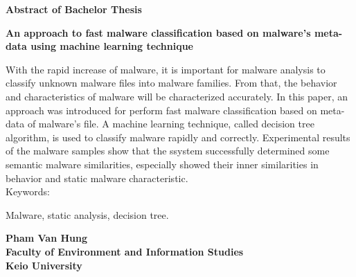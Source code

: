 \begin{center}


\begin{Large}
{\bf Abstract of Bachelor Thesis} \\

\vspace{5mm}

{\bf An approach to fast malware classification based on malware's meta-data using machine learning technique}
\end{Large}
\end{center}

\vspace{0.8cm}
 
  With the rapid increase of malware, it is important for malware analysis to classify unknown malware files into malware families. From that, the behavior and characteristics of malware will be characterized accurately. In this paper, an approach was introduced for perform fast malware classification based on meta-data of malware's file. A machine learning technique, called decision tree algorithm, is used to classify malware rapidly and correctly. Experimental results of the malware samples show that the ssystem successfully determined some semantic malware similarities, especially showed their inner similarities in behavior and static malware characteristic.  \\

Keywords:

Malware, static analysis, decision tree.

\vspace{0.5cm}

\begin{flushright}
{\bf Pham Van Hung}\\
\vspace{2mm}
{\bf Faculty of Environment and Information Studies}\\
{\bf Keio University}\\
\end{flushright}